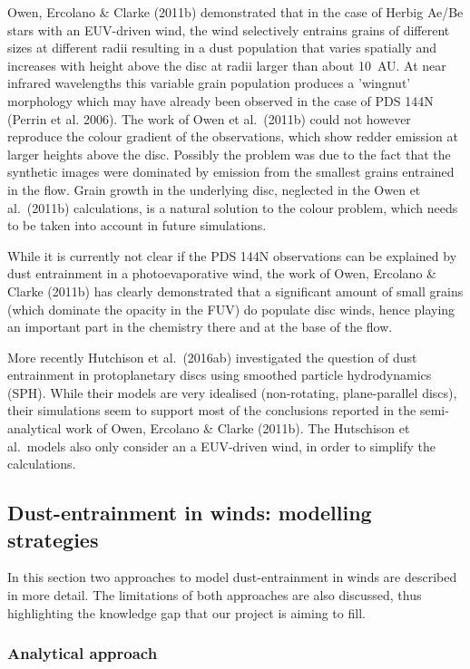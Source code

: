 \documentclass[10pt,fleqn,twoside]{article}
\begin{document}
Owen, Ercolano \& Clarke (2011b) demonstrated that in the case of
Herbig Ae/Be stars with an EUV-driven wind, the wind selectively entrains
grains of different sizes at different radii resulting in a dust
population that varies spatially and increases with height above the
disc at radii larger than about 10~AU. At near infrared wavelengths
this variable grain population produces a 'wingnut' morphology which
may have already been observed in the case of PDS 144N (Perrin et al.
2006). The work of Owen et al.\ (2011b) could not however reproduce the
colour gradient of the observations, which show redder emission at
larger heights above the disc. Possibly the problem was due to the
fact that the synthetic images were dominated by emission from the
smallest grains entrained in the flow. Grain growth in the underlying
disc, neglected in the
Owen et al.\ (2011b) calculations, is a natural solution to
the colour problem, which needs to be taken into account in future
simulations. 

While it is currently not clear if the PDS 144N observations can be
explained by dust entrainment in a photoevaporative wind, the work of
Owen, Ercolano \& Clarke (2011b) has clearly demonstrated that a
significant amount of small grains (which dominate the opacity in the
FUV) do populate disc winds, hence playing an important part in the
chemistry there and at the base of the flow. 

More recently Hutchison et al.\ (2016ab) investigated the question of
dust entrainment in protoplanetary discs using smoothed particle
hydrodynamics (SPH). While their models are very idealised (non-rotating,
plane-parallel discs), their simulations seem to support most of the
conclusions reported in the semi-analytical work of Owen, Ercolano \&
Clarke (2011b). The Hutschison et al.\ models also only consider an a
EUV-driven wind, in order to simplify the calculations.  

\subsection{Dust-entrainment in winds: modelling strategies}

In this section two approaches to model dust-entrainment in
winds are described in more detail. The limitations of both approaches
are also discussed, thus highlighting the knowledge gap that our
project is aiming to fill. 

\subsubsection{Analytical approach}\label{sec:analytical-approach}
\end{document}
